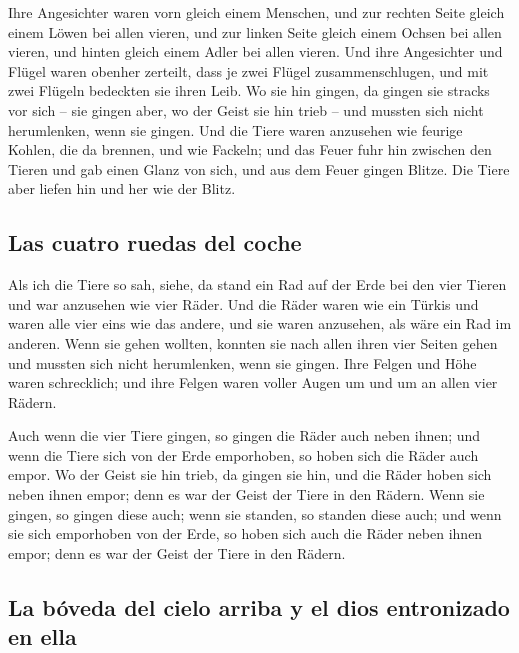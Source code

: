  Ihre Angesichter waren vorn gleich einem Menschen, und
zur rechten Seite gleich einem Löwen bei allen vieren, und zur linken
Seite gleich einem Ochsen bei allen vieren, und hinten gleich einem
Adler bei allen vieren.  Und ihre Angesichter und Flügel
waren obenher zerteilt, dass je zwei Flügel zusammenschlugen, und mit
zwei Flügeln bedeckten sie ihren Leib.  Wo sie hin
gingen, da gingen sie stracks vor sich -- sie gingen aber, wo der Geist
sie hin trieb -- und mussten sich nicht herumlenken, wenn sie gingen.
 Und die Tiere waren anzusehen wie feurige Kohlen, die da
brennen, und wie Fackeln; und das Feuer fuhr hin zwischen den Tieren und
gab einen Glanz von sich, und aus dem Feuer gingen Blitze.
 Die Tiere aber liefen hin und her wie der Blitz.

\hypertarget{las-cuatro-ruedas-del-coche}{%
\subsection{Las cuatro ruedas del
coche}\label{las-cuatro-ruedas-del-coche}}

 Als ich die Tiere so sah, siehe, da stand ein Rad auf
der Erde bei den vier Tieren und war anzusehen wie vier Räder.
 Und die Räder waren wie ein Türkis und waren alle vier
eins wie das andere, und sie waren anzusehen, als wäre ein Rad im
anderen.  Wenn sie gehen wollten, konnten sie nach allen
ihren vier Seiten gehen und mussten sich nicht herumlenken, wenn sie
gingen.  Ihre Felgen und Höhe waren schrecklich; und ihre
Felgen waren voller Augen um und um an allen vier Rädern.

 Auch wenn die vier Tiere gingen, so gingen die Räder
auch neben ihnen; und wenn die Tiere sich von der Erde emporhoben, so
hoben sich die Räder auch empor.  Wo der Geist sie hin
trieb, da gingen sie hin, und die Räder hoben sich neben ihnen empor;
denn es war der Geist der Tiere in den Rädern.  Wenn sie
gingen, so gingen diese auch; wenn sie standen, so standen diese auch;
und wenn sie sich emporhoben von der Erde, so hoben sich auch die Räder
neben ihnen empor; denn es war der Geist der Tiere in den Rädern.

\hypertarget{la-buxf3veda-del-cielo-arriba-y-el-dios-entronizado-en-ella}{%
\subsection{La bóveda del cielo arriba y el dios entronizado en
ella}\label{la-buxf3veda-del-cielo-arriba-y-el-dios-entronizado-en-ella}}

